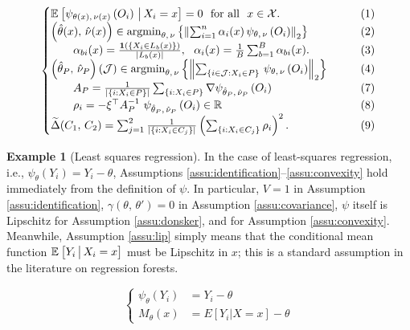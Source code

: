 \documentclass[aos]{imsart}
\theoremstyle{plain}
\theoremstyle{definition}
\newtheorem{exam}{Example}
\theoremstyle{remark}
\begin{document}
\begin{CJK}{UTF8}{gbsn}
\begin{equation*}
\begin{cases}
\EE{\psi_{\theta(x), \, \nu(x)}\p{O_i} \cond X_i = x} = 0 \ \text{ for all } \ x \in \xx. &\qquad (1) \\
\p{\htheta(x), \, \hnu(x)} \in \argmin_{\theta, \, \nu} \cb{\Norm{\sum_{i = 1}^n \alpha_i(x) \, \psi_{\theta, \, \nu}\p{O_i}}_2} &\qquad (2) \\
\qquad  \alpha_{bi}(x) = \frac{\1\p{\cb{X_i \in L_b(x)}}}{\abs{L_b(x)}}, \ \ \alpha_i(x) = \frac{1}{B} \sum_{b = 1}^B \alpha_{bi}(x).  &\qquad (3) \\
\p{\htheta_P, \, \hnu_P}(\mathcal{J}) \in \argmin_{\theta, \, \nu} \cb{\Norm{\sum_{\cb{i\in\mathcal{J} : X_i \in P}} \, \psi_{\theta, \, \nu}\p{O_i}}_2}   &\qquad (4) \\
\qquad A_P = \frac{1}{\abs{\cb{i : X_i \in P}}} \sum_{\cb{i : X_i \in P}} \nabla \psi_{\htheta_P, \, \hnu_P}\p{O_i} &\qquad (7) \\
\qquad  \rho_i = -\xi^\top A_P^{-1} \ \psi_{\htheta_P, \, \hnu_P}\p{O_i} \in \RR &\qquad (8) \\
\tDelta(C_1, \, C_2) =  \sum_{j = 1}^2\frac{1}{\abs{\cb{i : X_i \in C_j}}}\p{ \sum_{\cb{i : X_i \in C_j}} \rho_i}^2. &\qquad (9)
\end{cases}
\end{equation*}

\begin{exam}[Least squares regression]
\label{exam:regression}
In the case of least-squares regression, i.e., $\psi_{\theta}(Y_i) = Y_i - \theta$,
Assumptions \ref{assu:identification}--\ref{assu:convexity} hold immediately from the
definition of $\psi$. In particular, $V = 1$ in Assumption \ref{assu:identification},
$\gamma(\theta, \, \theta') = 0$ in Assumption \ref{assu:covariance},
$\psi$ itself is Lipschitz for Assumption \ref{assu:donsker}, and 
 for Assumption \ref{assu:convexity}.
Meanwhile, Assumption \ref{assu:lip} simply means that
the conditional mean function $\mathbb{E}_{}\left[Y_i \,\big|\, X_i = x\right]$ must be Lipschitz in $x$;
this is a standard assumption in the literature on regression forests.
\end{exam}

\begin{equation*}
\begin{cases}
\psi_{\theta}(Y_i) &= Y_i - \theta \\
M_{\theta}(x) &= E[Y_i|X=x] - \theta
\end{cases}
\end{equation*}



\end{CJK}
\end{document}
